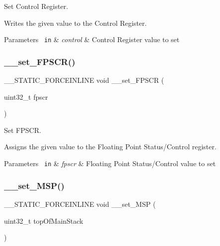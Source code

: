 Set Control Register. 

Writes the given value to the Control Register. 
\begin{DoxyParams}[1]{Parameters}
\mbox{\texttt{ in}}  & {\em control} & Control Register value to set \\
\hline
\end{DoxyParams}
\mbox{\label{group___c_m_s_i_s___core___reg_acc_functions_ga63aa6f7ed41dcaf39cbccb11e812ad4e}} 
\subsubsection{\texorpdfstring{\_\_set\_FPSCR()}{\_\_set\_FPSCR()}}
{\footnotesize\ttfamily \+\_\+\+\_\+\+S\+T\+A\+T\+I\+C\+\_\+\+F\+O\+R\+C\+E\+I\+N\+L\+I\+NE void \+\_\+\+\_\+set\+\_\+\+F\+P\+S\+CR (\begin{DoxyParamCaption}\item[{uint32\+\_\+t}]{fpscr }\end{DoxyParamCaption})}



Set F\+P\+S\+CR. 

Assigns the given value to the Floating Point Status/\+Control register. 
\begin{DoxyParams}[1]{Parameters}
\mbox{\texttt{ in}}  & {\em fpscr} & Floating Point Status/\+Control value to set \\
\hline
\end{DoxyParams}
\mbox{\label{group___c_m_s_i_s___core___reg_acc_functions_ga08b66e2b60a46fada36d90d2bc1e7c9b}} 
\subsubsection{\texorpdfstring{\_\_set\_MSP()}{\_\_set\_MSP()}}
{\footnotesize\ttfamily \+\_\+\+\_\+\+S\+T\+A\+T\+I\+C\+\_\+\+F\+O\+R\+C\+E\+I\+N\+L\+I\+NE void \+\_\+\+\_\+set\+\_\+\+M\+SP (\begin{DoxyParamCaption}\item[{uint32\+\_\+t}]{top\+Of\+Main\+Stack }\end{DoxyParamCaption})}



